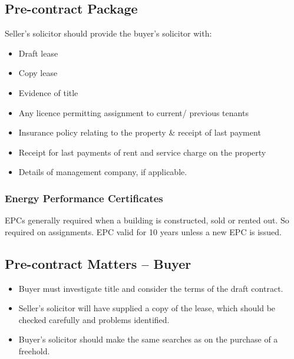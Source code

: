 \documentclass[
]{article}
\providecommand{\tightlist}{%
  \setlength{\itemsep}{0pt}\setlength{\parskip}{0pt}}
\begin{document}
\hypertarget{pre-contract-package-1}{%
\subsection{Pre-contract Package}\label{pre-contract-package-1}}

Seller's solicitor should provide the buyer's solicitor with:

\begin{itemize}
\tightlist
\item
  Draft lease
\item
  Copy lease
\item
  Evidence of title
\item
  Any licence permitting assignment to current/ previous tenants
\item
  Insurance policy relating to the property \& receipt of last payment
\item
  Receipt for last payments of rent and service charge on the property
\item
  Details of management company, if applicable.
\end{itemize}

\hypertarget{energy-performance-certificates}{%
\subsubsection{Energy Performance
Certificates}\label{energy-performance-certificates}}

EPCs generally required when a building is constructed, sold or rented
out. So required on assignments. EPC valid for 10 years unless a new EPC
is issued.

\hypertarget{pre-contract-matters-buyer}{%
\subsection{Pre-contract Matters --
Buyer}\label{pre-contract-matters-buyer}}

\begin{itemize}
\tightlist
\item
  Buyer must investigate title and consider the terms of the draft
  contract.
\item
  Seller's solicitor will have supplied a copy of the lease, which
  should be checked carefully and problems identified.
\item
  Buyer's solicitor should make the same searches as on the purchase of
  a freehold.
\end{itemize}
\end{document}
